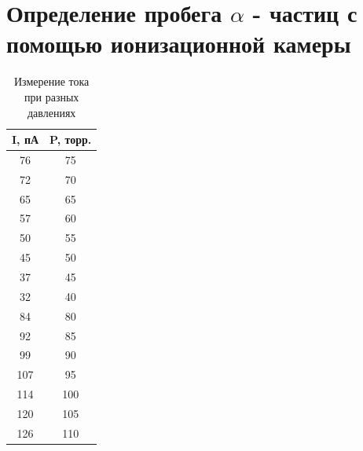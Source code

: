 \documentclass[a4paper,14pt]{extarticle}
\begin{document}
	\section{Определение пробега $\alpha$ - частиц с помощью ионизационной камеры} %
	\label{sec:определение_пробега_alpha_частиц_с_помощью_ионизационной_камеры}
	\begin{table}[h!]
		\centering
		\caption{Измерение тока при разных давлениях}
		\begin{tabular}{|c|c|}	
			\hline
			I, пА & P, торр. \\ \hline
			76	&	75	\\ \hline
			72	&	70	\\ \hline
			65	&	65	\\ \hline
			57	&	60	\\ \hline
			50	&	55	\\ \hline
			45	&	50	\\ \hline
			37	&	45	\\ \hline
			32	&	40	\\ \hline
			84	&	80	\\ \hline
			92	&	85	\\ \hline
			99	&	90	\\ \hline
			107	&	95	\\ \hline
			114	&	100	\\ \hline
			120	&	105	\\ \hline
			126	&	110	\\ \hline
			

\end{tabular}
\end{table}
\end{document}
